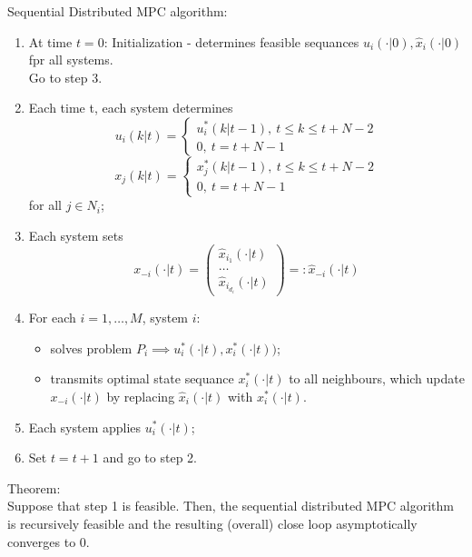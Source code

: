     Sequential Distributed MPC algorithm:
    \begin{enumerate}
        \item At time $t=0$: Initialization - determines feasible sequances $\hat u_i(\cdot|0), \hat x_i(\cdot|0)$ fpr all systems.\\
        Go to step 3.
        \item Each time t, each system determines
        $$u_i(k|t) = \left \{ \begin{array}{ll} u_i^*(k|t-1), \ t \le k \le t+N-2 \\ 0, \ t = t+N-1 \end{array} \right.$$
        $$x_j(k|t) = \left \{ \begin{array}{ll} x_j^*(k|t-1), \ t \le k \le t+N-2 \\ 0, \ t = t+N-1 \end{array} \right.$$
        for all $j \in N_i$;
        \item Each system sets
         $$x_{-i}(\cdot|t) = \begin{pmatrix} \hat x_{i_1}(\cdot|t) \\ \dots \\ \hat x_{i_{d_i}}(\cdot|t) \end{pmatrix} =: \hat x_{-i}(\cdot|t)$$
         \item For each $i=1, \dots, M$, system $i$:
         \begin{itemize}
             \item solves problem $P_i \implies u_i^*(\cdot|t),x_i^*(\cdot|t))$;
             \item transmits optimal state sequance $x_i^*(\cdot|t)$ to all neighbours, which update $x_{-i}(\cdot|t)$ by replacing $\hat x_i(\cdot|t)$ with $x_i^*(\cdot|t)$.
         \end{itemize}
         \item Each system applies $u_i^*(\cdot|t)$;
         \item Set $t=t+1$ and go to step 2.
    \end{enumerate}
    
    Theorem: \\
    Suppose that step 1 is feasible. Then, the sequential distributed MPC algorithm is recursively feasible and the resulting (overall) close loop asymptotically converges to 0.\\
    
